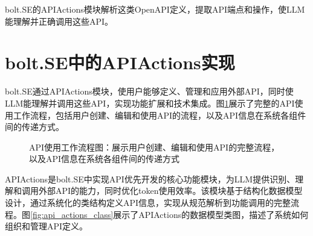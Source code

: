 bolt.SE的APIActions模块解析这类OpenAPI定义，提取API端点和操作，使LLM能理解并正确调用这些API。

\section{bolt.SE中的APIActions实现}
bolt.SE通过APIActions模块，使用户能够定义、管理和应用外部API，同时使LLM能理解并调用这些API，实现功能扩展和技术集成。图\ref{fig:api_workflow}展示了完整的API使用工作流程，包括用户创建、编辑和使用API的流程，以及API信息在系统各组件间的传递方式。

\begin{figure}[htbp]
  \caption{API使用工作流程图：展示用户创建、编辑和使用API的完整流程，以及API信息在系统各组件间的传递方式}
  \label{fig:api_workflow}
\end{figure}

APIActions是bolt.SE中实现API优先开发的核心功能模块，为LLM提供识别、理解和调用外部API的能力，同时优化token使用效率。该模块基于结构化数据模型设计，通过系统化的类结构定义API信息，实现从规范解析到功能调用的完整流程。图\ref{fig:api_actions_class}展示了APIActions的数据模型类图，描述了系统如何组织和管理API定义。

